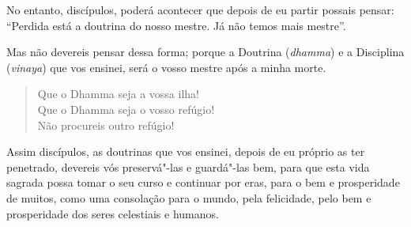 
No entanto, discípulos, poderá acontecer que depois de eu partir possais pensar:
“Perdida está a doutrina do nosso mestre. Já não temos mais mestre”.

Mas não devereis pensar dessa forma; porque a Doutrina (\emph{dhamma}) e a
Disciplina (\emph{vinaya}) que vos ensinei, será o vosso mestre após a minha
morte.

\begin{verse}
  Que o Dhamma seja a vossa ilha!\\
  Que o Dhamma seja o vosso refúgio!\\
  Não procureis outro refúgio!
\end{verse}

Assim discípulos, as doutrinas que vos ensinei, depois de eu próprio as ter
penetrado, devereis vós preservá"-las e guardá"-las bem, para que esta vida
sagrada possa tomar o seu curso e continuar por eras, para o bem e prosperidade
de muitos, como uma consolação para o mundo, pela felicidade, pelo bem e
prosperidade dos seres celestiais e humanos.

